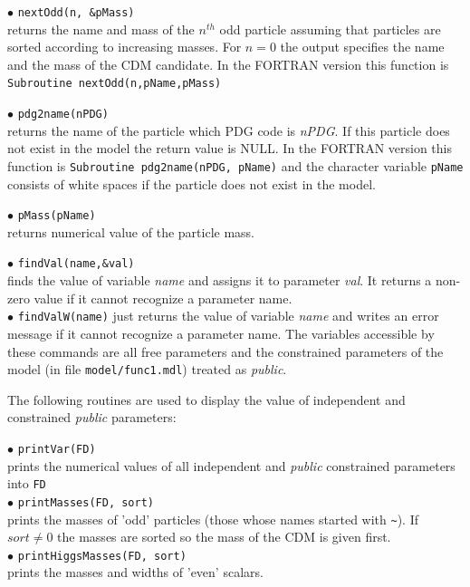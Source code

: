 \documentclass[12pt,a4paper]{article}
\begin{document}
\noindent
$\bullet$  \verb|nextOdd(n, &pMass)| \\
returns the name and mass of the $n^{th}$ odd particle assuming that particles are 
sorted according to increasing masses. For $n=0$ the output specifies the 
name and the mass of the CDM candidate. In the FORTRAN version this function 
is \verb|Subroutine nextOdd(n,pName,pMass)| 

\noindent
$\bullet$  \verb|pdg2name(nPDG)| \\
returns  the name of  the particle which PDG code is {\it nPDG}. If this particle does not exist in the model
the return value is NULL.  In the FORTRAN version this function
is \verb|Subroutine pdg2name(nPDG, pName)| and the character variable
\verb|pName| consists of white
spaces if the particle does not exist in the model. 

\noindent
$\bullet$  \verb|pMass(pName)| \\
returns  numerical value of the particle mass.

\noindent
$\bullet$ \verb|findVal(name,&val)|\\
 finds the  value of
 variable  {\it name} and assigns it to parameter {\it val}. It returns a non-zero
value  if it cannot recognize  a parameter name. \\
$\bullet$ \verb|findValW(name)| 
just returns the value of variable {\it name} and writes an error message
if it cannot recognize  a parameter name.
The variables accessible by these commands are all free parameters and   the 
constrained parameters of the model (in file \verb|model/func1.mdl|)
treated as {\it public}. 

The following routines are used to display the value of independent and constrained 
{\it public}
parameters: 


\noindent
$\bullet$ \verb|printVar(FD)|\\ 
prints the numerical values of all independent and {\it public} 
constrained parameters into \verb|FD|\\
$\bullet$ \verb|printMasses(FD, sort)|\\
 prints the masses of 'odd' particles
(those whose names  started with \verb|~|). If $sort\ne 0$
the masses are sorted so the mass of the CDM is given first.\\
$\bullet$ \verb|printHiggsMasses(FD, sort)|\\
prints the masses and widths of 'even' scalars.\\
\end{document}
